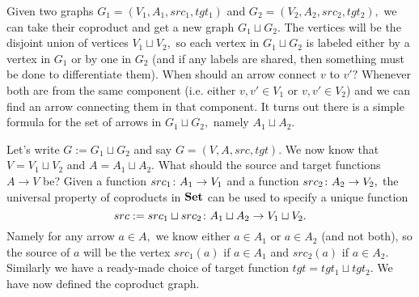 \documentclass[CT4S-EN-RU]{subfiles}
\begin{document}
\begin{exampleENG}\label{ex:coproduct of graphs}
Given two graphs $G_1=(V_1,A_1,src_1,tgt_1)$ and $G_2=(V_2,A_2,src_2,tgt_2),$ we can take their coproduct and get a new graph $G_1\sqcup G_2.$ The vertices will be the disjoint union of vertices $V_1\sqcup V_2,$ so each vertex in $G_1\sqcup G_2$ is labeled either by a vertex in $G_1$ or by one in $G_2$ (and if any labels are shared, then something must be done to differentiate them). When should an arrow connect $v$ to $v'?$ Whenever both are from the same component (i.e. either $v,v'\in V_1$ or $v,v'\in V_2$) and we can find an arrow connecting them in that component. It turns out there is a simple formula for the set of arrows in $G_1\sqcup G_2,$ namely $A_1\sqcup A_2.$

Let's write $G:=G_1\sqcup G_2$ and say $G=(V,A,src,tgt).$ We now know that $V=V_1\sqcup V_2$ and $A=A_1\sqcup A_2.$ What should the source and target functions $A\to V$ be? Given a function $src_1\colon A_1\rightarrow V_1$ and a function $src_2\colon A_2\rightarrow V_2,$ the universal property of coproducts in ${\mathbf{Set}}$ can be used to specify a unique function 
$$src:=src_1\sqcup src_2\colon A_1\sqcup A_2\rightarrow V_1\sqcup V_2.$$ 
Namely for any arrow $a\in A,$ we know either $a\in A_1$ or $a\in A_2$ (and not both), so the source of $a$ will be the vertex $src_1(a)$ if $a\in A_1$ and $src_2(a)$ if $a\in A_2.$ Similarly we have a ready-made choice of target function $tgt=tgt_1\sqcup tgt_2.$ We have now defined the coproduct graph.


\end{exampleENG}
\end{document}
